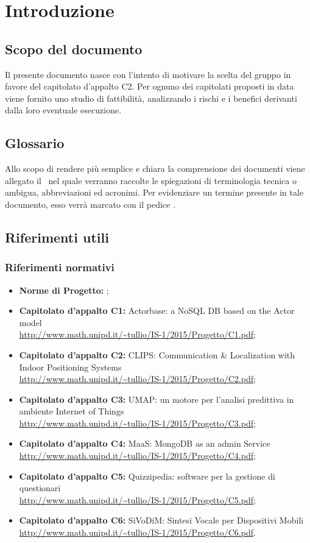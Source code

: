 \documentclass[../StudioDiFattibilita.tex]{subfiles}
\begin{document}
\section{Introduzione}
	\subsection{Scopo del documento}
	Il presente documento nasce con l'intento di motivare la scelta del gruppo \leaf in favore del capitolato d'appalto C2. Per ognuno dei capitolati proposti in data  viene fornito uno studio di fattibilità, analizzando i rischi e i benefici derivanti dalla loro eventuale esecuzione.
	\subsection{Glossario} \label{sec:Glossario}
	Allo scopo di rendere più semplice e chiara la comprensione dei documenti viene allegato il \glossariov\ nel quale verranno raccolte le spiegazioni di  terminologia tecnica o  ambigua,
	abbreviazioni ed acronimi. Per evidenziare un termine presente in tale documento, esso verrà marcato con il pedice \g.
	\subsection{Riferimenti utili}
		\subsubsection{Riferimenti normativi}
		\begin{itemize}
			\item \textbf{Norme di Progetto:} \normediprogettov;
			\item \textbf{Capitolato d'appalto C1:} Actorbase: a NoSQL DB based on the Actor model \\\url{http://www.math.unipd.it/~tullio/IS-1/2015/Progetto/C1.pdf};
			\item \textbf{Capitolato d'appalto C2:} CLIPS: Communication \& Localization with Indoor Positioning Systems \\\url{http://www.math.unipd.it/~tullio/IS-1/2015/Progetto/C2.pdf};
			\item \textbf{Capitolato d'appalto C3:} UMAP: un motore per l'analisi predittiva in ambiente Internet of Things \\\url{http://www.math.unipd.it/~tullio/IS-1/2015/Progetto/C3.pdf};
			\item \textbf{Capitolato d'appalto C4:} MaaS: MongoDB as an admin Service \\\url{http://www.math.unipd.it/~tullio/IS-1/2015/Progetto/C4.pdf};
			\item \textbf{Capitolato d'appalto C5:} Quizzipedia: software per la gestione di questionari \\\url{http://www.math.unipd.it/~tullio/IS-1/2015/Progetto/C5.pdf};
			\item \textbf{Capitolato d'appalto C6:} SiVoDiM: Sintesi Vocale per Dispositivi Mobili \\\url{http://www.math.unipd.it/~tullio/IS-1/2015/Progetto/C6.pdf}.
		\end{itemize}
\end{document}

